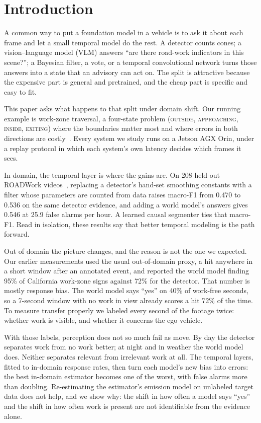 \documentclass[conference]{IEEEtran}
\newcommand{\st}[1]{\textsc{#1}}
\begin{document}
\section{Introduction}
\label{sec:intro}

A common way to put a foundation model in a vehicle is to ask it about each frame and let a small temporal model do the rest. A detector counts cones; a vision--language model (VLM) answers ``are there road-work indicators in this scene?''; a Bayesian filter, a vote, or a temporal convolutional network turns those answers into a state that an advisory can act on. The split is attractive because the expensive part is general and pretrained, and the cheap part is specific and easy to fit.

This paper asks what happens to that split under domain shift. Our running example is work-zone traversal, a four-state problem (\st{outside}, \st{approaching}, \st{inside}, \st{exiting}) where the boundaries matter most and where errors in both directions are costly~\cite{nhtsa2023,priorsystem2026}. Every system we study runs on a Jetson AGX Orin, under a replay protocol in which each system's own latency decides which frames it sees.

In domain, the temporal layer is where the gains are. On 208 held-out ROADWork videos~\cite{ghosh2025roadwork}, replacing a detector's hand-set smoothing constants with a filter whose parameters are counted from data raises macro-F1 from 0.470 to 0.536 on the same detector evidence, and adding a world model's answers gives 0.546 at 25.9 false alarms per hour. A learned causal segmenter ties that macro-F1. Read in isolation, these results say that better temporal modeling is the path forward.

Out of domain the picture changes, and the reason is not the one we expected. Our earlier measurements used the usual out-of-domain proxy, a hit anywhere in a short window after an annotated event, and reported the world model finding 95\% of California work-zone signs against 72\% for the detector. That number is mostly response bias. The world model says ``yes'' on 40\% of work-free seconds, so a 7-second window with no work in view already scores a hit 72\% of the time. To measure transfer properly we labeled every second of the footage twice: whether work is visible, and whether it concerns the ego vehicle.

With those labels, perception does not so much fail as move. By day the detector separates work from no work better; at night and in weather the world model does. Neither separates relevant from irrelevant work at all. The temporal layers, fitted to in-domain response rates, then turn each model's new bias into errors: the best in-domain estimator becomes one of the worst, with false alarms more than doubling. Re-estimating the estimator's emission model on unlabeled target data does not help, and we show why: the shift in how often a model says ``yes'' and the shift in how often work is present are not identifiable from the evidence alone.
\end{document}

